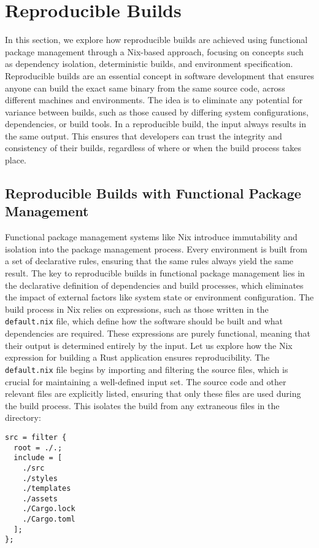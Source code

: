 \section{Reproducible Builds}

In this section, we explore how reproducible builds are achieved
using functional package management
through a Nix-based approach, focusing on concepts such as dependency isolation,
deterministic builds, and environment specification.
Reproducible builds are an essential concept in software development that ensures
anyone can build the exact same binary from the same source code, across different
machines and environments. The idea is to eliminate any potential for variance
between builds, such as those caused by differing system configurations, dependencies,
or build tools. In a reproducible build, the input always results in the same output.
This ensures that developers can trust the integrity and consistency of their builds,
regardless of where or when the build process takes place.

\subsection{Reproducible Builds with Functional Package Management}

Functional package management systems like Nix introduce immutability and isolation
into the package management process. Every environment is built from a set of
declarative rules, ensuring that the same rules always yield the same result.
The key to reproducible builds in functional package management lies in the
declarative definition of dependencies and build processes, which eliminates
the impact of external factors like system state or environment configuration.
The build process in Nix relies on expressions, such as those written in the
\texttt{default.nix} file, which define how the software should be built and what
dependencies are required. These expressions are purely functional, meaning that
their output is determined entirely by the input. Let us explore how the Nix
expression for building a Rust application ensures reproducibility.
The \texttt{default.nix} file begins by importing and filtering the source files,
which is crucial for maintaining a well-defined input set. The source code and
other relevant files are explicitly listed, ensuring that only these files are
used during the build process. This isolates the build from any extraneous files
in the directory:

\begin{lstlisting}[caption={Source filtering in Nix}]
src = filter {
  root = ./.;
  include = [
    ./src
    ./styles
    ./templates
    ./assets
    ./Cargo.lock
    ./Cargo.toml
  ];
};
\end{lstlisting}

